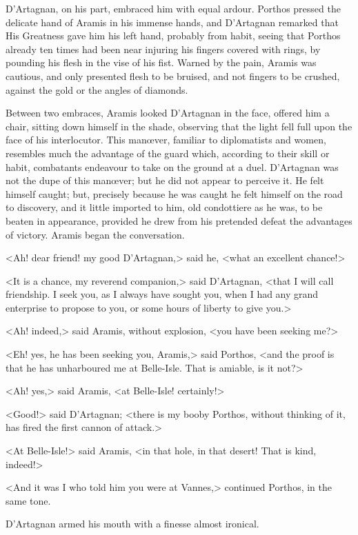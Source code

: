 D'Artagnan, on his part, embraced him with equal ardour. Porthos pressed the delicate hand of Aramis in his immense hands, and D'Artagnan remarked that His Greatness gave him his left hand, probably from habit, seeing that Porthos already ten times had been near injuring his fingers covered with rings, by pounding his flesh in the vise of his fist. Warned by the pain, Aramis was cautious, and only presented flesh to be bruised, and not fingers to be crushed, against the gold or the angles of diamonds.

Between two embraces, Aramis looked D'Artagnan in the face, offered him a chair, sitting down himself in the shade, observing that the light fell full upon the face of his interlocutor. This manœver, familiar to diplomatists and women, resembles much the advantage of the guard which, according to their skill or habit, combatants endeavour to take on the ground at a duel. D'Artagnan was not the dupe of this manœver; but he did not appear to perceive it. He felt himself caught; but, precisely because he was caught he felt himself on the road to discovery, and it little imported to him, old condottiere as he was, to be beaten in appearance, provided he drew from his pretended defeat the advantages of victory. Aramis began the conversation.

<Ah! dear friend! my good D'Artagnan,> said he, <what an excellent chance!>

<It is a chance, my reverend companion,> said D'Artagnan, <that I will call friendship. I seek you, as I always have sought you, when I had any grand enterprise to propose to you, or some hours of liberty to give you.>

<Ah! indeed,> said Aramis, without explosion, <you have been seeking me?>

<Eh! yes, he has been seeking you, Aramis,> said Porthos, <and the proof is that he has unharboured me at Belle-Isle. That is amiable, is it not?>

<Ah! yes,> said Aramis, <at Belle-Isle! certainly!>

<Good!> said D'Artagnan; <there is my booby Porthos, without thinking of it, has fired the first cannon of attack.>

<At Belle-Isle!> said Aramis, <in that hole, in that desert! That is kind, indeed!>

<And it was I who told him you were at Vannes,> continued Porthos, in the same tone.

D'Artagnan armed his mouth with a finesse almost ironical.

